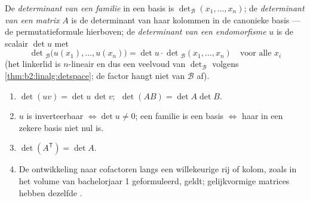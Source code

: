 \begin{definition}[Determinanten]\label{def:b2:linalg:det}
De \emph{determinant van een familie} in een
basis is $\det_{\mathcal{B}}(x_1, \dots, x_n)$; de
\emph{determinant van een matrix} $A$ is de determinant van haar
kolommen in de canonieke basis --- de permutatieformule hierboven;
de \emph{determinant van een endomorfisme} $u$ is de scalair $\det
u$ met
\[
\det{}_{\mathcal{B}}\bigl(u(x_1), \dots, u(x_n)\bigr)
= \det u \cdot \det{}_{\mathcal{B}}(x_1, \dots, x_n)
\quad \text{voor alle } x_i
\]
(het linkerlid is  $n$-lineair en dus een veelvoud van
$\det_\mathcal{B}$ volgens \cref{thm:b2:linalg:detspace}; de
factor hangt niet van $\mathcal{B}$ af).
\end{definition}

\begin{theorem}\label{thm:b2:linalg:detrules}
\begin{enumerate}
  \item $\det(uv) = \det u\,\det v$; $\;\det(AB) = \det A \det B$.
  \item $u$ is inverteerbaar $\iff \det u \neq 0$; een familie is
        een basis $\iff$ haar  in een zekere basis niet
        nul is.
  \item $\det(A^{\mathsf T}) = \det A$.
  \item De ontwikkeling naar cofactoren langs een willekeurige rij
        of kolom, zoals in het volume van bachelorjaar 1
        geformuleerd, geldt; gelijkvormige matrices hebben dezelfde
        .
\end{enumerate}
\end{theorem}


